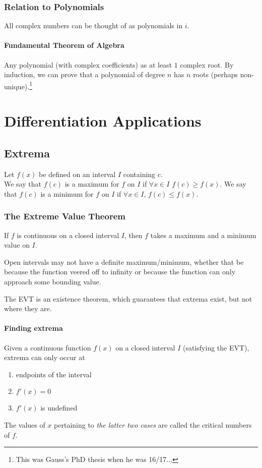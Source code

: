 \documentclass{article}
\begin{document}
\subsubsection{Relation to Polynomials}
All complex numbers can be thought of as polynomials in $i$.

\paragraph{Fundamental Theorem of Algebra} Any polynomial (with complex coefficients) as at least $1$ complex root. By induction, we can prove that a polynomial of degree $n$ has $n$ roots (perhaps non-unique).\footnote{This was Gauss's PhD thesis when he was 16/17...}


\section{Differentiation Applications}
\subsection{Extrema}
Let $f(x)$ be defined on an interval $I$ containing $c$.\\
We say that $f(c)$ is a maximum for $f$ on $I$ if $\forall x \in I$ $f(c) \ge f(x)$.
We say that $f(c)$ is a minimum for $f$ on $I$ if $\forall x \in I$, $f(c) \le f(x)$.

\subsubsection{The Extreme Value Theorem} If $f$ is continuous on a closed interval $I$, then $f$ takes a maximum and a minimum value on $I$.

Open intervals may not have a definite maximum/minimum, whether that be because the function veered off to infinity or because the function can only approach some bounding value.

The EVT is an existence theorem, which guarantees that extrema exist, but not where they are.

\paragraph{Finding extrema}
Given a continuous function $f(x)$ on a closed interval $I$ (satisfying the EVT), extrema can only occur at
\begin{enumerate}
    \item endpoints of the interval
    \item $f'(x) = 0$
    \item $f'(x)$ is undefined
\end{enumerate}
The values of $x$ pertaining to \emph{the latter two cases} are called the critical numbers of $f$.
\end{document}

